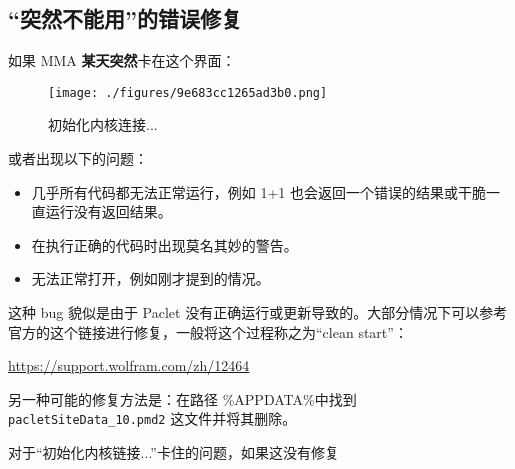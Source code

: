 \subsection{“突然不能用”的错误修复}
如果 MMA \textbf{某天突然}卡在这个界面：
\begin{figure}[ht]
\centering
\texttt{[image: ./figures/9e683cc1265ad3b0.png]}
\caption{初始化内核连接...} \label{fig_Mma_2}
\end{figure}
或者出现以下的问题：

\begin{itemize}
\item 几乎所有代码都无法正常运行，例如 1+1 也会返回一个错误的结果或干脆一直运行没有返回结果。
\item 在执行正确的代码时出现莫名其妙的警告。
\item 无法正常打开，例如刚才提到的情况。
\end{itemize}

这种 bug 貌似是由于 Paclet 没有正确运行或更新导致的。大部分情况下可以参考官方的这个链接进行修复，一般将这个过程称之为“clean start”：

\href{https://support.wolfram.com/zh/12464}{https://support.wolfram.com/zh/12464}


另一种可能的修复方法是：在路径 \%APPDATA\%\Mathematica\Paclets\Configuration 中找到 \verb`pacletSiteData_10.pmd2` 这文件并将其删除。

对于“初始化内核链接...”卡住的问题，如果这没有修复